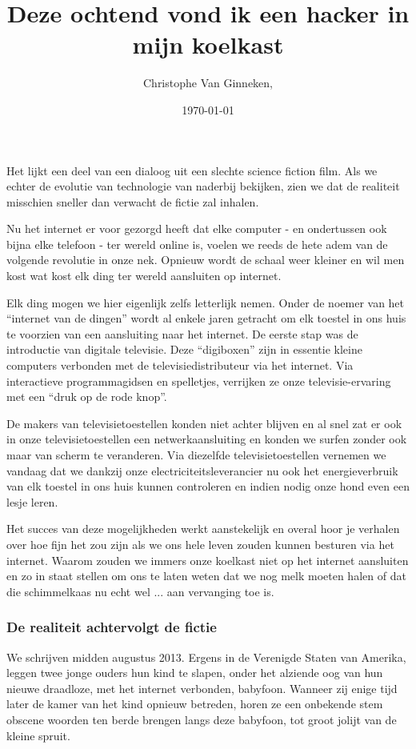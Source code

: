 \documentclass[DIV=calc,paper=a4,fontsize=11pt,twocolumn,draft]{scrartcl}
\title{Deze ochtend vond ik een hacker in mijn koelkast}
\author{Christophe Van Ginneken, }
\date{\today}
\newcommand{\initial}[1]{
\lettrine[lines=3,lhang=0.3,nindent=0em]{
\color{DarkGoldenrod}
{\textsf{#1}}}{}}
\begin{document}
\maketitle
\thispagestyle{fancy}

\initial{H}et lijkt een deel van een dialoog uit een slechte science fiction
film. Als we echter de evolutie van technologie van naderbij bekijken, zien we
dat de realiteit misschien sneller dan verwacht de fictie zal inhalen.

Nu het internet er voor gezorgd heeft dat elke computer - en ondertussen ook
bijna elke telefoon - ter wereld online is, voelen we reeds de hete adem van de
volgende revolutie in onze nek. Opnieuw wordt de schaal weer kleiner en wil men
kost wat kost elk ding ter wereld aansluiten op internet.

Elk ding mogen we hier eigenlijk zelfs letterlijk nemen. Onder de noemer van
het ``internet van de dingen'' wordt al enkele jaren getracht om elk toestel in
ons huis te voorzien van een aansluiting naar het internet. De eerste stap was
de introductie van digitale televisie. Deze ``digiboxen'' zijn in essentie
kleine computers verbonden met de televisiedistributeur via het internet. Via
interactieve programmagidsen en spelletjes, verrijken ze onze
televisie-ervaring met een ``druk op de rode knop''.

De makers van televisietoestellen konden niet achter blijven en al snel zat er
ook in onze televisietoestellen een netwerkaansluiting en konden we surfen
zonder ook maar van scherm te veranderen. Via diezelfde televisietoestellen
vernemen we vandaag dat we dankzij onze electriciteitsleverancier nu ook het
energieverbruik van elk toestel in ons huis kunnen controleren en indien nodig
onze hond even een lesje leren.

Het succes van deze mogelijkheden werkt aanstekelijk en overal hoor je verhalen
over hoe fijn het zou zijn als we ons hele leven zouden kunnen besturen via het
internet. Waarom zouden we immers onze koelkast niet op het internet aansluiten
en zo in staat stellen om ons te laten weten dat we nog melk moeten halen of
dat die schimmelkaas nu echt wel ... aan vervanging toe is.

\subsubsection*{De realiteit achtervolgt de fictie}
\vspace{-3mm}

We schrijven midden augustus 2013. Ergens in de Verenigde Staten van Amerika,
leggen twee jonge ouders hun kind te slapen, onder het alziende oog van hun
nieuwe draadloze, met het internet verbonden, babyfoon. Wanneer zij enige tijd
later de kamer van het kind opnieuw betreden, horen ze een onbekende stem
obscene woorden ten berde brengen langs deze babyfoon, tot groot jolijt van de
kleine spruit.
\end{document}
